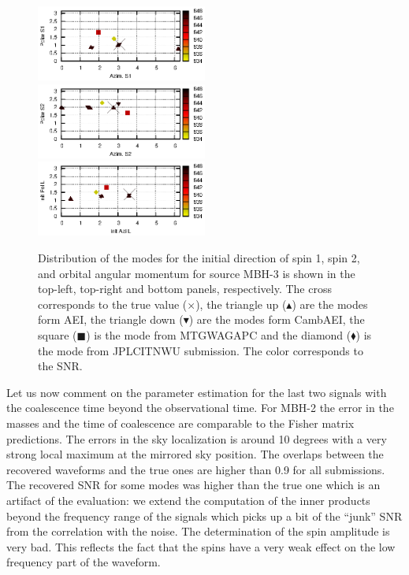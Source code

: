 \documentclass{iopart}
\begin{document}
\begin{figure}
\includegraphics[width=0.5\textwidth, clip=true, viewport=0 4 198 83 ]{DirS1_srcMC2_SNR.eps}
\includegraphics[width=0.5\textwidth, clip=true, viewport=0 4 198 83 ]{DirS2_srcMC2_SNR.eps}\\
\center \includegraphics[width=0.5\textwidth, clip=true, viewport=0 4 198 83 ]{DirL_srcMC2_SNR.eps}
\caption{Distribution of the modes for the initial direction of spin 1, spin 2, and orbital angular momentum for source MBH-3 is shown in the top-left, top-right and bottom panels, respectively. The cross corresponds to the true value ($\times$), the triangle up ($\blacktriangle$) are the modes form AEI, the triangle down ($\blacktriangledown$) are the modes form CambAEI, the square ($\blacksquare$) is the mode from MTGWAGAPC and the diamond ($\blacklozenge$) is the mode from JPLCITNWU submission. The color corresponds to the SNR.
\label{fig:SMBH_spinLdeg}}
\end{figure}


Let us now comment on the parameter estimation for the last two signals with the coalescence time beyond the observational time. For MBH-2 the error in the masses and the time of coalescence are comparable to the Fisher matrix predictions. 
The errors in the sky localization is around 10 degrees with a very strong local maximum at the mirrored 
sky position. The overlaps between the recovered waveforms and the true ones are higher than 0.9 for all submissions.
The recovered SNR for some modes was higher than the true one which is an artifact of the evaluation: 
we extend the computation of the inner products beyond the frequency range of the signals which picks up a bit of the 
``junk'' SNR from the correlation with the noise. 
%
The determination of the spin amplitude is very bad. This reflects the fact that the spins have a very weak effect on the low frequency part of the waveform. 
\end{document}
